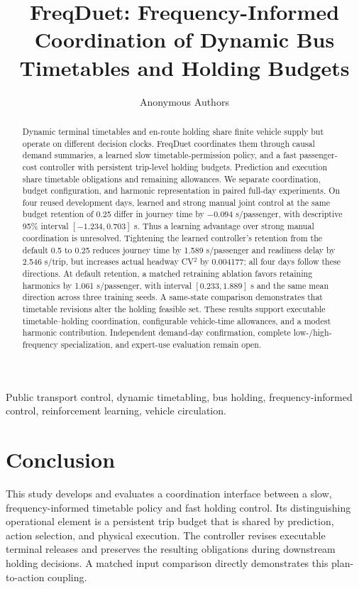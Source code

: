 \documentclass[letterpaper,journal]{IEEEtran}
\begin{document}
\title{FreqDuet: Frequency-Informed Coordination of Dynamic Bus Timetables and Holding Budgets}
\author{Anonymous Authors}
\maketitle
\begin{abstract}
Dynamic terminal timetables and en-route holding share finite vehicle supply but operate on different decision clocks. FreqDuet coordinates them through causal demand summaries, a learned slow timetable-permission policy, and a fast passenger-cost controller with persistent trip-level holding budgets. Prediction and execution share timetable obligations and remaining allowances. We separate coordination, budget configuration, and harmonic representation in paired full-day experiments. On four reused development days, learned and strong manual joint control at the same budget retention of 0.25 differ in journey time by $-0.094$ s/passenger, with descriptive 95\% interval $[-1.234,0.703]$ s. Thus a learning advantage over strong manual coordination is unresolved. Tightening the learned controller's retention from the default 0.5 to 0.25 reduces journey time by 1.589 s/passenger and readiness delay by 2.546 s/trip, but increases actual headway CV$^2$ by 0.004177; all four days follow these directions. At default retention, a matched retraining ablation favors retaining harmonics by 1.061 s/passenger, with interval $[0.233,1.889]$ s and the same mean direction across three training seeds. A same-state comparison demonstrates that timetable revisions alter the holding feasible set. These results support executable timetable--holding coordination, configurable vehicle-time allowances, and a modest harmonic contribution. Independent demand-day confirmation, complete low-/high-frequency specialization, and expert-use evaluation remain open.
\end{abstract}
\begin{IEEEkeywords}
Public transport control, dynamic timetabling, bus holding, frequency-informed control, reinforcement learning, vehicle circulation.
\end{IEEEkeywords}







\section{Conclusion}
This study develops and evaluates a coordination interface between a slow, frequency-informed timetable policy and fast holding control. Its distinguishing operational element is a persistent trip budget that is shared by prediction, action selection, and physical execution. The controller revises executable terminal releases and preserves the resulting obligations during downstream holding decisions. A matched input comparison directly demonstrates this plan-to-action coupling.
\end{document}

